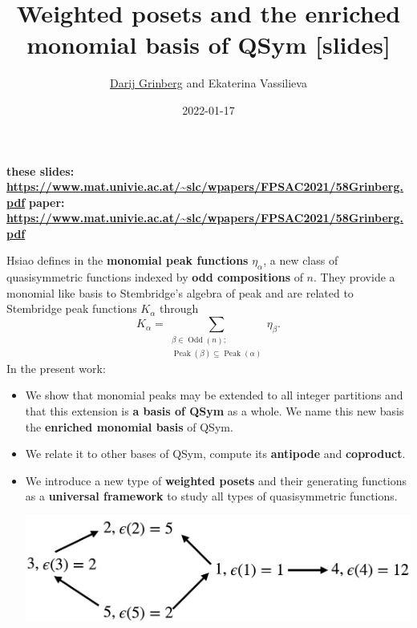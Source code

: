 \documentclass[numbers=enddot,12pt,final,onecolumn,notitlepage]{scrartcl}%
\newcommand{\al}{\alpha}
\newcommand{\Odd}{\operatorname{Odd}}
\newcommand{\Peak}{\operatorname{Peak}}
\newcommand{\0}{\phantom{c}}
\let\sumnonlimits\sum
\renewcommand{\sum}{\sumnonlimits\limits}
\begin{document}
\title{Weighted posets and the enriched monomial basis of QSym [slides]}
\author{\href{http://www.cip.ifi.lmu.de/~grinberg/}{Darij Grinberg} and Ekaterina Vassilieva}
\date{2022-01-17}
\maketitle

\noindent \textbf{these slides: \color{red}
\url{https://www.mat.univie.ac.at/~slc/wpapers/FPSAC2021/58Grinberg.pdf}}%
\newline\textbf{paper: \color{red}
\url{https://www.mat.univie.ac.at/~slc/wpapers/FPSAC2021/58Grinberg.pdf}}%
\newline

\begin{tcolorbox}[colback=cyan!5,colframe=cyan!75!black, fonttitle=\bfseries,title=Summary of our work] Hsiao defines in \cite{Hsi07} the \textbf{monomial peak functions} $\eta_{\al}$, a new class of quasisymmetric functions indexed by \textbf{odd compositions} of $n$. They provide a monomial like basis to Stembridge's algebra of peak \cite{Ste97} and are related to Stembridge peak functions $K_\al$ through
\begin{equation*}
K_{\al} = \sum_{{\substack{\beta \in \Odd(n);\\ \Peak(\beta) \subseteq \Peak(\al)}}} \eta_{\beta}.
\end{equation*}
In the present work: 
\begin{itemize}
\item We show that monomial peaks may be extended to all integer partitions and that this extension is \textbf{a basis of QSym} as a whole. We name this new basis the \textbf{enriched monomial basis} of QSym.
\item We relate it to other bases of QSym, compute its \textbf{antipode} and \textbf{coproduct}. 
\item We introduce a new type of \textbf{weighted posets} and their generating functions as a \textbf{universal framework} to study all types of quasisymmetric functions.

\begin{center}
\includegraphics[scale=0.16]{Poset.png}
\end{center}
 

\end{itemize}
\end{tcolorbox}
\end{document}
